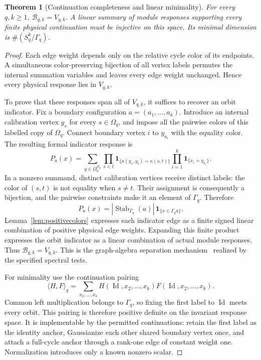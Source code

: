 \documentclass[11pt,a4paper]{amsart}
\numberwithin{equation}{section}
\newtheorem{theorem}{Theorem}[section]
\theoremstyle{definition}
\theoremstyle{remark}
\DeclareMathOperator{\Id}{Id}
\begin{document}
\begin{theorem}[Continuation completeness and linear minimality]\label{thm:physicalcomplete}
For every $q,k\ge1$, $\mathcal B_{q,k}=V_{q,k}$. A linear summary of module responses supporting every finite physical continuation must be injective on this space. Its minimal dimension is
$\#(S_q^k/\Gamma_q)$.
\end{theorem}
\begin{proof}
Each edge weight depends only on the relative cycle color of its endpoints. A simultaneous color-preserving bijection of all vertex labels permutes the internal summation variables and leaves every edge weight unchanged. Hence every physical response lies in $V_{q,k}$.

To prove that these responses span all of $V_{q,k}$, it suffices to recover an orbit indicator. Fix a boundary configuration $a=(a_1,\ldots,a_k)$. Introduce an internal calibration vertex $y_s$ for every $s\in\Omega_q$, and impose all the pairwise colors of this labelled copy of $\Omega_q$. Connect boundary vertex $i$ to $y_{a_i}$ with the equality color. The resulting formal indicator response is
\begin{equation}\label{eq:physical_calibration}
 P_a(x)=\sum_{y\in\Omega_q^{\Omega_q}}
 \prod_{s<t}\mathbf1_{\{\kappa(y_s,y_t)=\kappa(s,t)\}}
 \prod_{i=1}^k\mathbf1_{\{x_i=y_{a_i}\}}.
\end{equation}
In a nonzero summand, distinct calibration vertices receive distinct labels: the color of $(s,t)$ is not equality when $s\ne t$. Their assignment is consequently a bijection, and the pairwise constraints make it an element of $\Gamma_q$. Therefore
\[
 P_a(x)=|\operatorname{Stab}_{\Gamma_q}(a)|\,
                  \mathbf1_{\{x\in\Gamma_qa\}}.
\]
Lemma~\ref{lem:positivecolors} expresses each indicator edge as a finite signed linear combination of positive physical edge weights. Expanding this finite product expresses the orbit indicator as a linear combination of actual module responses. Thus $\mathcal B_{q,k}=V_{q,k}$. This is the graph-algebra separation mechanism~\cite{Lovasz} realized by the specified spectral tests.

For minimality use the continuation pairing
\begin{equation}\label{eq:physical_pairing}
 \langle H,F\rangle_q
 =\sum_{x_2,\ldots,x_k}H(\Id,x_2,\ldots,x_k)F(\Id,x_2,\ldots,x_k).
\end{equation}
Common left multiplication belongs to $\Gamma_q$, so fixing the first label to $\Id$ meets every orbit. This pairing is therefore positive definite on the invariant response space. It is implementable by the permitted continuations: retain the first label as the identity anchor, Gaussianize each other shared boundary vertex once, and attach a full-cycle anchor through a rank-one edge of constant weight one. Normalization introduces only a known nonzero scalar.


\end{proof}
\end{document}
